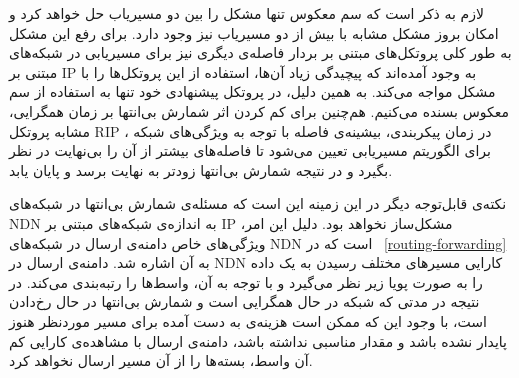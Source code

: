 لازم به ذکر است که سم معکوس تنها مشکل را بین دو مسیریاب حل خواهد کرد و امکان بروز مشکل مشابه با بیش از دو مسیریاب نیز وجود دارد. برای رفع این مشکل به طور کلی پروتکل‌های مبتنی بر بردار فاصله‌ی دیگری نیز برای مسیریابی در شبکه‌های مبتنی بر IP به وجود آمده‌اند که پیچیدگی زیاد آن‌ها، استفاده از این پروتکل‌ها را با مشکل مواجه می‌کند. به همین دلیل، در پروتکل پیشنهادی خود تنها به استفاده از سم معکوس بسنده می‌کنیم. هم‌چنین برای کم کردن اثر شمارش بی‌انتها بر زمان همگرایی، مشابه پروتکل RIP ، در زمان پیکربندی، بیشینه‌ی فاصله با توجه به ویژگی‌های شبکه برای الگوریتم مسیریابی تعیین می‌شود تا فاصله‌های بیشتر از آن را بی‌نهایت در نظر بگیرد و در نتیجه شمارش بی‌انتها زودتر به نهایت برسد و پایان یابد. 

نکته‌ی قابل‌توجه دیگر در این زمینه این است که مسئله‌ی شمارش بی‌انتها در شبکه‌های NDN به اندازه‌ی شبکه‌های مبتنی بر IP مشکل‌ساز نخواهد بود. دلیل این امر، ویژگی‌های خاص دامنه‌ی ارسال در شبکه‌های NDN است که در ~\ref{routing-forwarding}  به آن اشاره شد. دامنه‌ی ارسال در NDN کارایی مسیرهای مختلف رسیدن به یک داده را به صورت پویا زیر نظر می‌گیرد و با توجه به آن، واسط‌ها را رتبه‌بندی می‌کند. در نتیجه در مدتی که شبکه در حال همگرایی است و شمارش بی‌انتها در حال رخ‌دادن است، با وجود این که ممکن است هزینه‌ی به دست آمده برای مسیر موردنظر هنوز پایدار نشده باشد و مقدار مناسبی نداشته باشد، دامنه‌ی ارسال با مشاهده‌ی کارایی کم آن واسط، بسته‌ها را از آن مسیر ارسال نخواهد کرد. 

